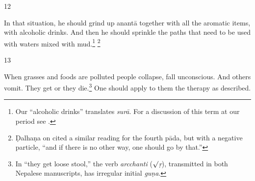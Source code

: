 \begin{translation}
\item [12]

In that situation, he should grind up \gls{anantā} together with all the aromatic
items, with alcoholic drinks.  And then  he should sprinkle the paths that need to
be used with waters mixed with mud.\footnote{Our “alcoholic drinks” translates
    \emph{surā}.  For a discussion of this term at our period see \cite[37--39
    \emph{et passim}]{mchu-2021a}.} \footnote{Ḍalhaṇa on  cited a similar reading for the fourth
        pāda, but with a negative particle,  “and if there is no other way, one should go
        by that.”}
    
    

\item [13]

When grasses and foods are polluted people collapse, fall unconscious. And others
vomit. They get  or they die.\footnote{In “they get
    loose stool,” the verb \emph{arcchanti} ($\surd$\emph{ṛ}), transmitted in both 
    Nepalese
    manuscripts, has irregular initial \emph{guṇa}.} One should apply to them the
    therapy as described.



\end{translation}